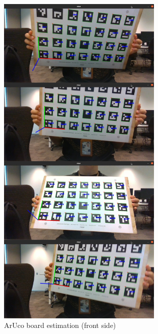 \begin{figure}[ht]
\centering
\includegraphics[width=0.7\textwidth]{Images/Board detection (front).jpg}
\caption{ArUco board estimation (front side)}
\end{figure}

